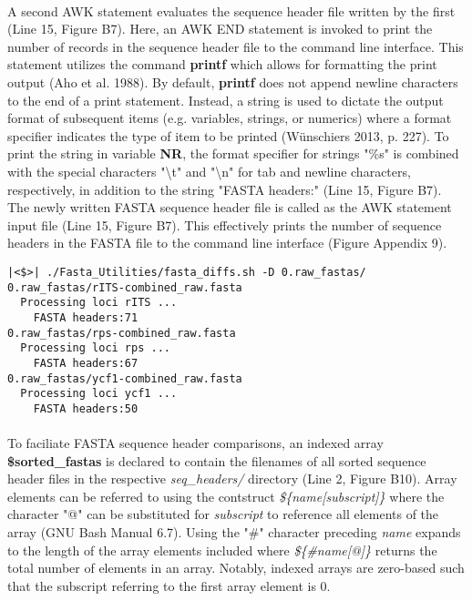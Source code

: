 \paragraph{} A second AWK statement evaluates the sequence header file written by the first (Line 15, Figure B7).  Here, an AWK END statement is invoked to print the number of records in the sequence header file to the command line interface.  This statement utilizes the command \textbf{printf} which allows for formatting the print output (Aho et al. 1988).  By default, \textbf{printf} does not append newline characters to the end of a print statement.  Instead, a string is used to dictate the output format of subsequent items (e.g. variables, strings, or numerics) where a format specifier indicates the type of item to be printed (Wünschiers 2013, p. 227).  To print the string in variable \textbf{NR}, the format specifier for strings "\%s" is combined with the special characters "\textbackslash t" and "\textbackslash n" for tab and newline characters, respectively, in addition to the string "FASTA headers:" (Line 15, Figure B7).  The newly written FASTA sequence header file is called as the AWK statement input file (Line 15, Figure B7).  This effectively prints the number of sequence headers in the FASTA file to the command line interface (Figure Appendix 9).

\vspace*{36pt}

\begin{lstlisting}[caption={Output of \textit{fasta\_diffs.sh} script.}]
|<$>| ./Fasta_Utilities/fasta_diffs.sh -D 0.raw_fastas/
0.raw_fastas/rITS-combined_raw.fasta
  Processing loci rITS ...
	FASTA headers:71
0.raw_fastas/rps-combined_raw.fasta
  Processing loci rps ...
	FASTA headers:67
0.raw_fastas/ycf1-combined_raw.fasta
  Processing loci ycf1 ...
	FASTA headers:50
\end{lstlisting}

\clearpage

\paragraph{} To faciliate FASTA sequence header comparisons, an indexed array \textbf{\$sorted\_fastas} is declared to contain the filenames of all sorted sequence header files in the respective \textit{seq\_headers/} directory (Line 2, Figure B10).  Array elements can be referred to using the contstruct \textit{\$\{name[subscript]\}} where the character "@" can be substituted for \textit{subscript} to reference all elements of the array (GNU Bash Manual 6.7).  Using the "\#" character preceding \textit{name} expands to the length of the array elements included where \textit{\$\{\#name[@]\}} returns the total number of elements in an array.  Notably, indexed arrays are zero-based such that the subscript referring to the first array element is 0.

